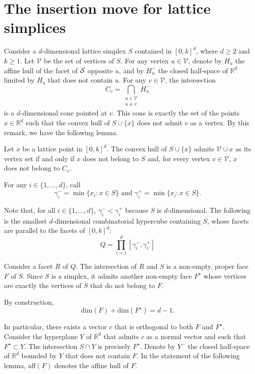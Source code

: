 \section{The insertion move for lattice simplices}\label{sec.insert}

Consider a $d$-dimensional lattice simplex $S$ contained in $[0,k]^d$, where $d\geq2$ and $k\geq1$. Let $\mathcal{V}$ be the set of vertices of $S$. For any vertex $u\in\mathcal{V}$, denote by $H_u$ the affine hull of the facet of $\S$ opposite $u$, and by $H_u^-$ the closed half-space of $\mathbb{R}^d$ limited by $H_u$ that does not contain $u$.
For any $v\in\mathcal{V}$, the intersection
\begin{equation}
  C_v=\bigcap_{\substack{u\in\mathcal{V}\\u\neq{v}}}H_u^-
\end{equation}
is a $d$-dimensional cone pointed at $v$. This cone is exactly the set of the points $x\in\mathbb{R}^d$ such that the convex hull of $S\cup\{x\}$ does not admit $v$ as a vertex. By this remark, we have the following lemma.

\begin{lemma}\label{Lem.A}
Let $x$ be a lattice point in $[0,k]^d$. The convex hull of $S\cup\{x\}$ admits $\mathcal{V}\cup{x}$ as its vertex set if and only if $x$ does not belong to $S$ and, for every vertex $v\in\mathcal{V}$, $x$ does not belong to $C_v$.
\end{lemma}

For any $i\in\{1, ..., d\}$, call
$$
\gamma_i^-=\min\{x_i:x\in{S}\}\mbox{ and }\gamma_i^+=\min\{x_i:x\in{S}\}\mbox{.}
$$

Note that, for all $i\in\{1, ..., d\}$, $\gamma_i^-<\gamma_i^+$ because $S$ is $d$-dimensional. The following is the smallest $d$-dimensional combinatorial hypercube containing $S$, whose facets are parallel to the facets of $[0,k]^d$:
$$
Q=\prod_{i=1}^d[\gamma_i^-,\gamma_i^+]
$$

Consider a facet $R$ of $Q$. The intersection of $R$ and $S$ is a non-empty, proper face $F$ of $S$. Since $S$ is a simplex, it admits another non-empty face $F^\star$ whose vertices are exactly the vertices of $S$ that do not belong to $F$.

By construction,
$$
\mathrm{dim}(F)+\mathrm{dim}(F^\star)=d-1\mbox{.}
$$

In particular, there exists a vector $c$ that is orthogonal to both $F$ and $F^\star$. Consider the hyperplane $Y$ of $\mathbb{R}^d$ that admits $c$ as a normal vector and such that $F^\star\subset{Y}$. The intersection $S\cap{Y}$ is precisely $F^\star$. Denote by $Y^-$ the closed half-space of $\mathbb{R}^d$ bounded by $Y$ that does not contain $F$. In the statement of the following lemma, $\mathrm{aff}(F)$ denotes the affine hull of $F$.

